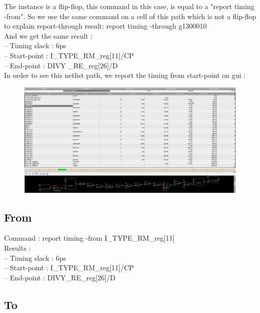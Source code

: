 \documentclass[11pt,a4paper,sans,dvipsnames]{report}
\begin{document}
	The instance is a flip-flop, this command in this case, is equal to a "report timing -from".
	So we use the same command on a cell of this path which is not a flip-flop to explain report-through result: 
	{\colorbox{Gray!50}{\textcolor{RubineRed}{report timing -through g1300010}}}\\
	And we get the same result :\\
	-- Timing slack :       6ps\\
	-- Start-point  : I\_TYPE\_RM\_reg[11]/CP\\
	-- End-point    : DIVY  \_RE\_reg[26]/D\\

	In order to see this netlist path, we report the timing from start-point on gui :
	\begin{figure}[h!]
		\includegraphics[width=1.1\linewidth, frame]{images/through_report.png}
		\label{fig:through_report_draw}
	\end{figure}

	\subsection{From}


	Command : {\colorbox{Gray!50}{\textcolor{RubineRed}{report timing -from I\_TYPE\_RM\_reg[11]}}}\\

	Results :\\
	-- Timing slack :       6ps \\
	-- Start-point  : I\_TYPE\_RM\_reg[11]/CP\\
	-- End-point    : DIVY\_RE\_reg[26]/D\\

	\subsection{To}
\end{document}
